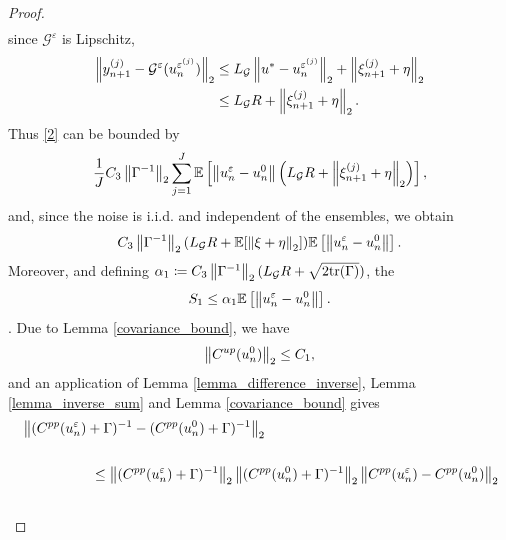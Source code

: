 \documentclass[10pt]{article}
\begin{document}
{\begin{proof}
\begin{align*}
\end{align*}
 since $\mathcal{G}^{\varepsilon}$ is Lipschitz, 
\begin{align*}
\left\|y_{n+1}^{(j)} - \mathcal{G}^{\varepsilon}(u_n^{\varepsilon^{(j)}})\right\|_2 \le & \; L_{\mathcal{G}} \left\|u^* - u_n^{\varepsilon^{(j)}}\right\|_2 + \left\|\xi_{n+1}^{(j)} + \eta\right\|_2 \\
\le & \; L_{\mathcal{G}} R + \left\|\xi_{n+1}^{(j)} + \eta\right\|_2.
\end{align*}
Thus \eqref{2} can be bounded by
\begin{equation*}
\frac{1}{J} C_3 \left\|\Gamma^{-1}\right\|_2 \sum_{j=1}^J \mathbb{E} \left [ \left\|u_n^{\varepsilon} - u_n^0\right\| \left( L_{\mathcal{G}} R + \left\|\xi_{n+1}^{(j)} + \eta\right\|_2 \right) \right ],
\end{equation*}
and, since the noise is i.i.d. and independent of the ensembles, we obtain
\begin{equation*}
C_3 \left\|\Gamma^{-1}\right\|_2 (L_{\mathcal{G}} R + \mathbb{E} [\left\|\xi + \eta\right\|_2]) \mathbb{E} \left [ \left\|u_n^{\varepsilon} - u_n^0\right\| \right ].
\end{equation*}
Moreover, 
and defining $\alpha_1 \coloneqq C_3 \left\|\Gamma^{-1}\right\|_2 (L_{\mathcal{G}} R + \sqrt{2\mathrm{tr}(\Gamma)})$, the 
\begin{equation}
\label{bound2}
S_1 \leq \alpha_1 \mathbb{E} \left [ \left\|u_n^{\varepsilon} - u_n^0\right\| \right ].
\end{equation}
. Due to Lemma \ref{covariance_bound}, we have
\begin{equation}\label{boundCup}
\left\|C^{up}(u_n^0)\right\|_2 \le C_1,
\end{equation}
and an application of Lemma \ref{lemma_difference_inverse}, Lemma \ref{lemma_inverse_sum} and Lemma \ref{covariance_bound} gives
\begin{align*}
& \norm{(C^{pp}(u_n^{\varepsilon}) + \Gamma)^{-1} - (C^{pp}(u_n^0) + \Gamma)^{-1}}_2 \\ \\
& \hspace{50pt} \le \norm{(C^{pp}(u_n^{\varepsilon}) + \Gamma)^{-1}}_2 \norm{(C^{pp}(u_n^0) + \Gamma)^{-1}}_2 \norm{C^{pp}(u_n^{\varepsilon}) - C^{pp}(u_n^0)}_2 \\ \\

\end{align*}
\end{proof}}
\end{document}
